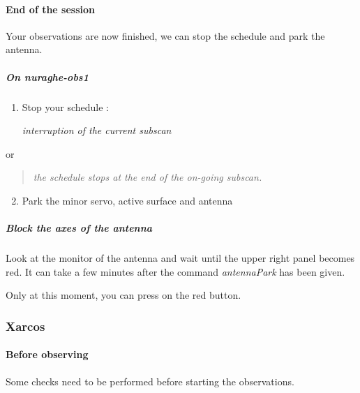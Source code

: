 \documentclass[letterpaper,10pt,english]{sphinxmanual}
\begin{document}
\paragraph{End of the session}
\label{SpectralLine/K-band/SARDARA/stop-session:end-of-the-session}\label{SpectralLine/K-band/SARDARA/stop-session::doc}
Your observations are now finished, we can stop the schedule and park
the antenna.


\subparagraph{On nuraghe-obs1}
\label{SpectralLine/K-band/SARDARA/stop-session:on-nuraghe-obs1}\begin{enumerate}
\item {} 
Stop your schedule :

   \emph{interruption of the current subscan}

\end{enumerate}

or
\begin{quote}

    \emph{the schedule stops at the end of the on-going subscan.}
\end{quote}
\begin{enumerate}
\setcounter{enumi}{1}
\item {} 
Park the minor servo, active surface and antenna





\end{enumerate}


\subparagraph{Block the axes of the antenna}
\label{SpectralLine/K-band/SARDARA/stop-session:block-the-axes-of-the-antenna}
Look at the monitor of the antenna and wait until the upper right
panel becomes red. It can take a few minutes after the command
\emph{antennaPark} has been given.

Only at this moment, you can press on the red button.


\subsubsection{Xarcos}
\label{SpectralLine/K-band/Xarcos/index:xarcos}\label{SpectralLine/K-band/Xarcos/index::doc}

\paragraph{Before observing}
\label{SpectralLine/K-band/Xarcos/before-obs:before-observing}\label{SpectralLine/K-band/Xarcos/before-obs::doc}
Some checks need to be performed before starting the observations.
\end{document}
